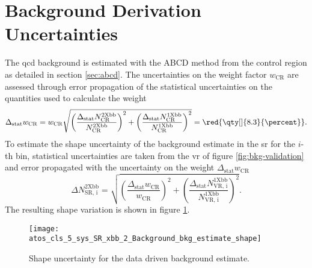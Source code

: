 \section{Background Derivation Uncertainties}
The \ac{qcd} background is estimated with the ABCD method from the control region as detailed in section \ref{sec:abcd}. The uncertainties on the weight factor $w_\text{CR}$ are assessed through error propagation of the statistical uncertainties on the quantities used to calculate the weight
\begin{equation}
    \Delta_\text{stat} w_\text{CR} = w_\text{CR} \sqrt{
        \left(\frac{\Delta_\text{stat} N_\text{CR}^\text{2Xbb}}{N_\text{CR}^\text{2Xbb}}\right)^2
        +
        \left(\frac{\Delta_\text{stat} N_\text{CR}^\text{1Xbb}}{N_\text{CR}^\text{1Xbb}}\right)^2
    }
    = \red{\qty[]{8.3}{\percent}}.
\end{equation}
To estimate the shape uncertainty of the background estimate in the \ac{sr} for the $i$-th bin, statistical uncertainties are taken from the \ac{vr} of figure \ref{fig:bkg-validation} and error propagated with the uncertainty on the weight $\Delta_\text{stat} w_\text{CR}$
\begin{equation}
    \Delta N_\text{SR, i}^\text{2Xbb}
    =
    \sqrt{
        \left(\frac{\Delta_\text{stat} w_\text{CR}}{w_\text{CR}}\right)^2
        +
        \left(\frac{\Delta_\text{stat} N_\text{VR, i}^\text{1Xbb}}{N_\text{VR, i}^\text{1Xbb}}\right)^2
    }.
\end{equation}
The resulting shape variation is shown in figure \ref{fig:bkg-estimate-shape}.
\begin{figure}
    \centering
    \texttt{[image: atos\_cls\_5\_sys\_SR\_xbb\_2\_Background\_bkg\_estimate\_shape]}
    \caption[]{Shape uncertainty for the data driven background estimate.}
    \label{fig:bkg-estimate-shape}
\end{figure}


